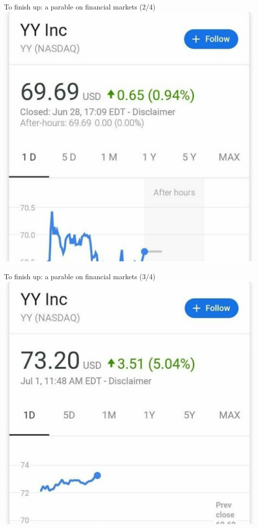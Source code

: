 \begin{frame}{To finish up: a parable on financial markets (2/4)}
	\centering \includegraphics[width=0.6\paperwidth]{pics/yy2}
\end{frame}


\begin{frame}{To finish up: a parable on financial markets (3/4)}
	\centering \includegraphics[width=0.6\paperwidth]{pics/yy3}
\end{frame}


